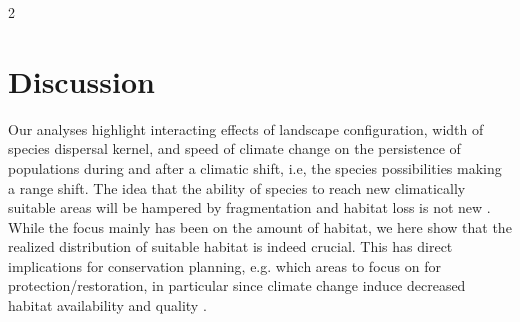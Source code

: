 \documentclass[12pt,pdftex]{article}
\begin{document}
\begin{spacing}{2}
\section*{Discussion}

Our analyses highlight interacting effects of landscape configuration, width of species dispersal kernel, and speed of climate change on the persistence of populations during and after a climatic shift, i.e, the species possibilities making a range shift. The idea that the ability of species to reach new climatically suitable areas will be hampered by fragmentation and habitat loss is not new \citep{Thomas2004}. While the focus mainly has been on the amount of habitat, we here show that the realized distribution of suitable habitat is indeed crucial. This has direct implications for conservation planning, e.g. which areas to focus on for protection/restoration, in particular since climate change induce decreased habitat availability and quality \citep{Martin2016}. 



\end{spacing}
\end{document}
